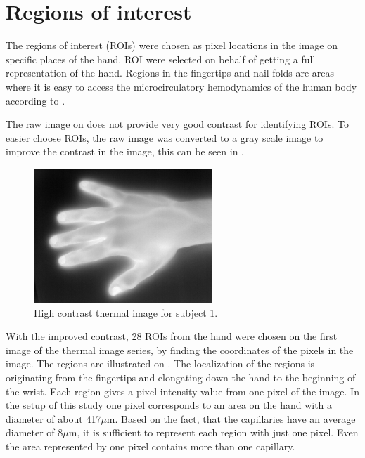 \section{Regions of interest}

The regions of interest (ROIs) were chosen as pixel locations in the image on specific places of the hand. ROI were selected on behalf of getting a full representation of the hand. 
Regions in the fingertips and nail folds are areas where it is easy to access the microcirculatory hemodynamics of the human body according to \cite{Iabichella2006}. 

The raw image on  does not provide very good contrast for identifying ROIs. To easier choose ROIs, the raw image was converted to a gray scale image to improve the contrast in the image, this can be seen in . 

\begin{figure}[H]
	\includegraphics[width=0.6\textwidth]{figures/mat2grayHand}  %
	\caption{High contrast thermal image for subject 1.}
	\label{fig:mat2grayHand}  %
\end{figure}

With the improved contrast, 28 ROIs from the hand were chosen on the first image of the thermal image series, by finding the coordinates of the pixels in the image. The regions are illustrated on . The localization of the regions is originating from the fingertips and elongating down the hand to the beginning of the wrist. Each region gives a pixel intensity value from one pixel of the image. In the setup of this study one pixel corresponds to an area on the hand with a diameter of about 417$\mu$m. Based on the fact, that the capillaries have an average diameter of 8$\mu$m\cite{martini2012}, it is sufficient to represent each region with just one pixel. Even the area represented by one pixel contains more than one capillary.

